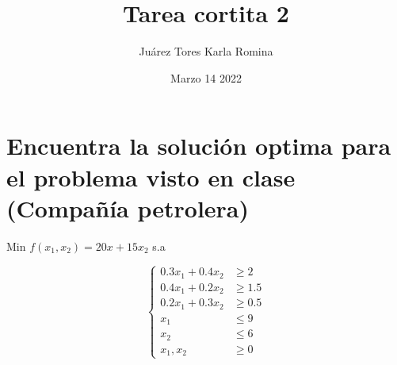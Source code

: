 \documentclass{article}
\title{Tarea cortita 2}
\author{Juárez Tores Karla Romina}
\date{Marzo 14 2022}
\begin{document}
\maketitle

\section*{Encuentra la solución optima para el problema visto en clase (Compañía petrolera)}
Min $f(x_1,x_2)=20x+15x_2$
s.a

$$\left\{
\begin{array}{rcl}
     0.3x_1+0.4x_2&\geq 2
  \\ 0.4x_1+0.2x_2&\geq 1.5
  \\ 0.2x_1+0.3x_2&\geq 0.5
  \\ x_1&\leq 9
  \\ x_2 &\leq 6
  \\ x_1, x_2 &\geq 0
\end{array}
\right.$$
\end{document}
